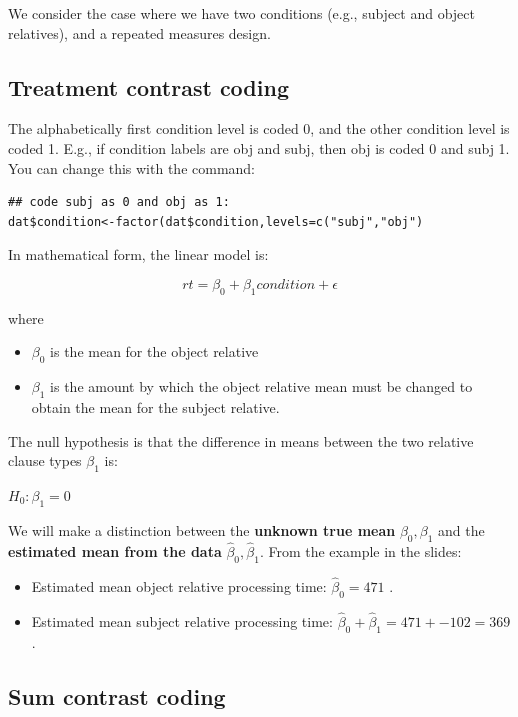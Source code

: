 \documentclass[12pt]{article}
\begin{document}
We consider the case where we have two conditions (e.g., subject and object relatives), and a repeated measures design. 

\subsection{Treatment contrast coding}

The alphabetically first condition level is coded 0, and the other condition level is coded 1. E.g., if condition labels are obj and subj, then obj is coded 0 and subj 1. You can change this with the command:

\begin{verbatim}
## code subj as 0 and obj as 1:
dat$condition<-factor(dat$condition,levels=c("subj","obj")
\end{verbatim}

In mathematical form, the linear model is:

\begin{equation}
rt = \beta_0 + \beta_1 condition + \epsilon
\end{equation}

where 

\begin{itemize}
\item
$\beta_0$ is the mean for the object relative
\item
$\beta_1$ is the amount by which the object relative mean must be 
changed to obtain the mean for the subject relative.
\end{itemize}

The null hypothesis is that the difference in means between the two relative clause types $\beta_1$ is:

$H_0: \beta_1 = 0$

We will make a distinction between the \textbf{unknown true mean} $\beta_0, \beta_1$ and the \textbf{estimated mean from the data} $\hat\beta_0, \hat\beta_1$.
From the example in the slides:

\begin{itemize}
\item
Estimated mean object relative processing time: $\hat\beta_0=471$
.
\item
Estimated mean subject relative processing time: $\hat\beta_0+\hat\beta_1=471+-102=369$.
\end{itemize}

\subsection{Sum contrast coding}
\end{document}
